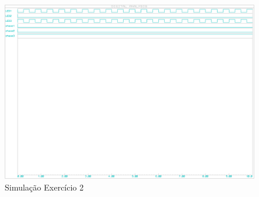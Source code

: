 \documentclass{Fabiano_file}
\begin{document}
\begin{figure}[h!]
\centering
\includegraphics[width=.9\textwidth]{exercicio2_simulacao.pdf}
\caption{Simulação Exercício 2}
\label{fig:exercicio2_simulacao}
\end{figure}

\pagebreak
\end{document}
